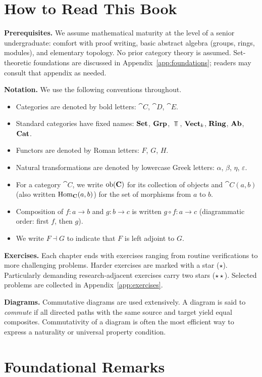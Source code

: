 \section{How to Read This Book}

\textbf{Prerequisites.} We assume mathematical maturity at the level of a senior undergraduate: comfort with proof writing, basic abstract algebra (groups, rings, modules), and elementary topology. No prior category theory is assumed. Set-theoretic foundations are discussed in Appendix~\ref{app:foundations}; readers may consult that appendix as needed.

\textbf{Notation.} We use the following conventions throughout.
\begin{itemize}
  \item Categories are denoted by bold letters: $\cat{C}$, $\cat{D}$, $\cat{E}$.
  \item Standard categories have fixed names: $\mathbf{Set}$, $\mathbf{Grp}$, $\Top$, $\mathbf{Vect}_k$, $\mathbf{Ring}$, $\mathbf{Ab}$, $\mathbf{Cat}$.
  \item Functors are denoted by Roman letters: $F$, $G$, $H$.
  \item Natural transformations are denoted by lowercase Greek letters: $\alpha$, $\beta$, $\eta$, $\varepsilon$.
  \item For a category $\cat{C}$, we write $\operatorname{ob}(\mathbf{C})$ for its collection of objects and $\cat{C}(a,b)$ (also written $\operatorname{Hom}_{\mathbf{C}}(a,b)$) for the set of morphisms from $a$ to $b$.
  \item Composition of $f: a \to b$ and $g: b \to c$ is written $g \circ f: a \to c$ (diagrammatic order: first $f$, then $g$).
  \item We write $F \dashv G$ to indicate that $F$ is left adjoint to $G$.
\end{itemize}

\textbf{Exercises.} Each chapter ends with exercises ranging from routine verifications to more challenging problems. Harder exercises are marked with a star ($\star$). Particularly demanding research-adjacent exercises carry two stars ($\star\star$). Selected problems are collected in Appendix~\ref{app:exercises}.

\textbf{Diagrams.} Commutative diagrams are used extensively. A diagram is said to \emph{commute} if all directed paths with the same source and target yield equal composites. Commutativity of a diagram is often the most efficient way to express a naturality or universal property condition.

\section{Foundational Remarks}

